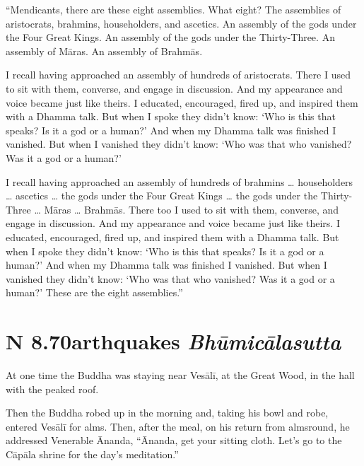 \documentclass[12pt,openany]{book}%
\newcommand*{\suttatitleacronym}[1]{\smaller[2]{#1}\vspace*{.3em}}
\newcommand*{\suttatitletranslation}[1]{\linebreak{#1}}
\newcommand*{\suttatitleroot}[1]{\linebreak\smaller[2]\itshape{#1}}
\newcommand*{\tocacronym}[1]{\hspace*{-3.3em}{#1}\quad}
\newcommand*{\toctranslation}[1]{#1}
\newcommand*{\tocroot}[1]{(\textit{#1})}
\begin{document}
“Mendicants, there are these eight assemblies. What eight? The assemblies of aristocrats, brahmins, householders, and ascetics. An assembly of the gods under the Four Great Kings. An assembly of the gods under the Thirty-Three. An assembly of \textsanskrit{Māras}. An assembly of \textsanskrit{Brahmās}. 

I recall having approached an assembly of hundreds of aristocrats. There I used to sit with them, converse, and engage in discussion. And my appearance and voice became just like theirs. I educated, encouraged, fired up, and inspired them with a Dhamma talk. But when I spoke they didn’t know: ‘Who is this that speaks? Is it a god or a human?’ And when my Dhamma talk was finished I vanished. But when I vanished they didn’t know: ‘Who was that who vanished? Was it a god or a human?’ 

I recall having approached an assembly of hundreds of brahmins … householders … ascetics … the gods under the Four Great Kings … the gods under the Thirty-Three … \textsanskrit{Māras} … \textsanskrit{Brahmās}. There too I used to sit with them, converse, and engage in discussion. And my appearance and voice became just like theirs. I educated, encouraged, fired up, and inspired them with a Dhamma talk. But when I spoke they didn’t know: ‘Who is this that speaks? Is it a god or a human?’ And when my Dhamma talk was finished I vanished. But when I vanished they didn’t know: ‘Who was that who vanished? Was it a god or a human?’ These are the eight assemblies.” 

%
\section*{{\suttatitleacronym AN 8.70}{\suttatitletranslation Earthquakes }{\suttatitleroot Bhūmicālasutta}}
\addcontentsline{toc}{section}{\tocacronym{AN 8.70} \toctranslation{Earthquakes } \tocroot{Bhūmicālasutta}}

At one time the Buddha was staying near \textsanskrit{Vesālī}, at the Great Wood, in the hall with the peaked roof. 

Then the Buddha robed up in the morning and, taking his bowl and robe, entered \textsanskrit{Vesālī} for alms. Then, after the meal, on his return from almsround, he addressed Venerable Ānanda, “Ānanda, get your sitting cloth. Let’s go to the \textsanskrit{Cāpāla} shrine for the day’s meditation.” 
\end{document}
